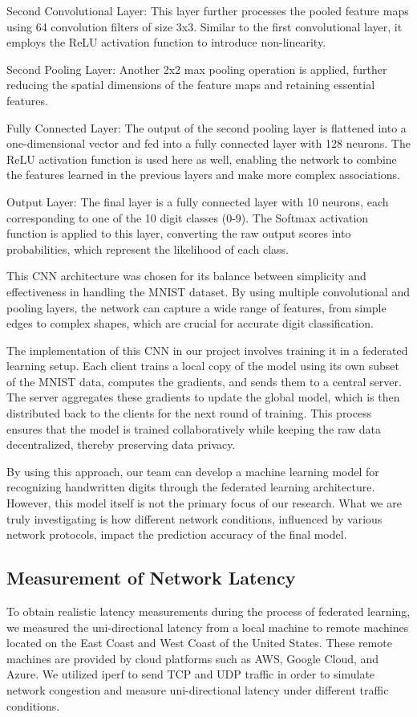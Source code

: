 \documentclass[conference]{IEEEtran}
\begin{document}
Second Convolutional Layer: This layer further processes the pooled feature maps using 64 convolution filters of size 3x3. Similar to the first convolutional layer, it employs the ReLU activation function to introduce non-linearity.

Second Pooling Layer: Another 2x2 max pooling operation is applied, further reducing the spatial dimensions of the feature maps and retaining essential features.

Fully Connected Layer: The output of the second pooling layer is flattened into a one-dimensional vector and fed into a fully connected layer with 128 neurons. The ReLU activation function is used here as well, enabling the network to combine the features learned in the previous layers and make more complex associations.

Output Layer: The final layer is a fully connected layer with 10 neurons, each corresponding to one of the 10 digit classes (0-9). The Softmax activation function is applied to this layer, converting the raw output scores into probabilities, which represent the likelihood of each class.

This CNN architecture was chosen for its balance between simplicity and effectiveness in handling the MNIST dataset. By using multiple convolutional and pooling layers, the network can capture a wide range of features, from simple edges to complex shapes, which are crucial for accurate digit classification.

The implementation of this CNN in our project involves training it in a federated learning setup. Each client trains a local copy of the model using its own subset of the MNIST data, computes the gradients, and sends them to a central server. The server aggregates these gradients to update the global model, which is then distributed back to the clients for the next round of training. This process ensures that the model is trained collaboratively while keeping the raw data decentralized, thereby preserving data privacy.

By using this approach, our team can develop a machine learning model for recognizing handwritten digits through the federated learning architecture. However, this model itself is not the primary focus of our research. What we are truly investigating is how different network conditions, influenced by various network protocols, impact the prediction accuracy of the final model.

\subsection{Measurement of Network Latency}
To obtain realistic latency measurements during the process of federated learning, we measured the uni-directional latency from a local machine to remote machines located on the East Coast and West Coast of the United States. These remote machines are provided by cloud platforms such as AWS, Google Cloud, and Azure. We utilized iperf to send TCP and UDP traffic in order to simulate network congestion and measure uni-directional latency under different traffic conditions. 
\end{document}
